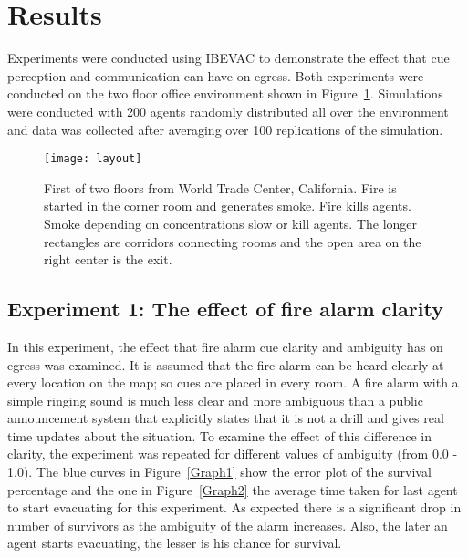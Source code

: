\section{Results}
\label{Results}

Experiments were conducted using IBEVAC to demonstrate the effect that cue perception and communication can have on egress. Both experiments were conducted on the two floor office environment shown in Figure~\ref{fig:layout}. Simulations were conducted with 200 agents randomly distributed all over the environment and data was collected after averaging over 100 replications of the simulation.

\begin{figure}[!tb]
\centering
\texttt{[image: layout]}
\caption[The Environment Layout]{First of two floors from World Trade Center, California. Fire is started in the corner room and generates smoke. Fire kills agents. Smoke depending on concentrations slow or kill agents. The longer rectangles are corridors connecting rooms and the open area on the right center is the exit.}
\label{fig:layout}
\end{figure}


\subsection{Experiment 1:  The effect of fire alarm clarity}
\label{experiment1}

In this experiment, the effect that fire alarm cue clarity and ambiguity has on egress was examined. It is assumed that the fire alarm can be heard clearly at every location on the map; so cues are placed in every room. A fire alarm with a simple ringing sound is much less clear and more ambiguous than a public announcement system that explicitly states that it is not a drill and gives real time updates about the situation. To examine the effect of this difference in clarity, the experiment was repeated for different values of ambiguity (from 0.0 - 1.0). The blue curves in Figure~\ref{Graph1} show the error plot of the survival percentage and the one in Figure~\ref{Graph2} the average time taken for last agent to start evacuating for this experiment. As expected there is a significant drop in number of survivors as the ambiguity of the alarm increases. Also, the later an agent starts evacuating, the lesser is his chance for survival.



